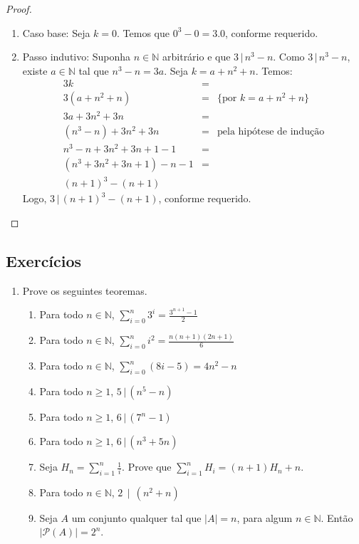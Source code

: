 \begin{proof}
\verb| |\\
\begin{enumerate}
  \item[\ ]Caso base: Seja $k = 0$. Temos que $0^3 - 0 = 3.0$, conforme requerido.
  \item[\ ]Passo indutivo: Suponha $n\in\mathbb{N}$ arbitrário e que
    $3\,|\,n^3 - n$. Como $3\,|\,n^3 - n$, existe $a\in\mathbb{N}$ tal
    que $n^3 - n = 3a$. Seja $k = a + n^2 + n$. Temos:
    \[
 \begin{array}{lcl}
   3k & = & \\
   3 (a + n^2 + n) & = & \{\text{por }k = a + n^2 + n\}\\
   3a + 3n^2 + 3n & = & \\
   (n^3 - n) + 3n^2 + 3n & = &\text{pela hipótese de indução}\\
   n^3 -n + 3n^2 + 3n + 1 - 1 & = & \\
   (n^3 + 3n^2 + 3n + 1) - n -1 & = & \\
   (n + 1)^3 - (n +1)
 \end{array}
    \]
    Logo, $3\,|\,(n+1)^3-(n+1)$, conforme requerido.
\end{enumerate}
\end{proof}

\subsection{Exercícios}

\begin{enumerate}
	\item Prove os seguintes teoremas.
	\begin{enumerate}
		\item Para todo $n\in\mathbb{N}$, $\sum_{i=0}^{n}3^i = \frac{3^{n + 1} - 1}{2}$
		\item Para todo $n\in\mathbb{N}$, $\sum_{i=0}^{n}i^{2} =
                  \frac{n(n+1)(2n + 1)}{6}$
                \item Para todo $n\in\mathbb{N}$, $\sum_{i=0}^{n}(8i - 5) =
                  4n^2 - n$
                \item Para todo $n\geq 1$, $5\,|\,(n^5-n)$
                \item Para todo $n\geq 1$, $6\,|\,(7^n-1)$
                \item Para todo $n\geq 1$, $6\,|\,(n^3+5n)$
                \item Seja $H_n = \sum_{i = 1}^n\frac{1}{i}$. Prove que
                  $\sum_{i=1}^nH_i = (n+1)H_n + n$.
		\item Para todo $n\in\mathbb{N}$, $2\,\mid\,(n^{2} + n)$
		\item Seja $A$ um conjunto qualquer tal que $|A| = n$, para algum $n\in\mathbb{N}$. Ent\~ao $|\mathcal{P}(A)| = 2^{n}$.
	\end{enumerate}
\end{enumerate}